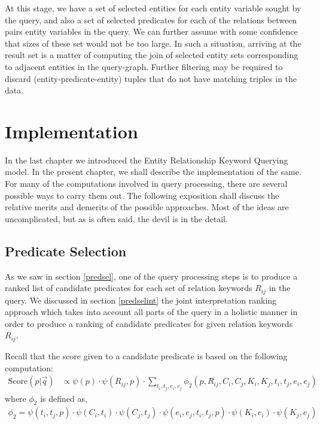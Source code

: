 \documentclass[a4paper, twoside, 12pt]{report}
\begin{document}
At this stage, we have a set of selected entities for each entity variable sought by the query, and also a set of selected predicates for each of the relations between pairs entity variables in the query. We can further assume with some confidence that sizes of these set would not be too large. In such a situation, arriving at the result set is a matter of computing the join of selected entity sets corresponding  to adjacent entities in the query-graph. Further filtering may be required to discard (entity-predicate-entity) tuples that do not have matching triples in the data.




\chapter{Implementation}

In the last chapter we introduced the Entity Relationship Keyword Querying model. In the present chapter, we shall describe the implementation of the same. For many of the computations involved in query processing, there are several possible ways to carry them out. The following exposition shall discuss the relative merits and demerits of the possible approaches. Most of the ideas are uncomplicated, but as is often said, the devil is in the detail.

\section{Predicate Selection}
As we saw in section \ref{predsel}, one of the query processing steps is to produce a ranked list of candidate predicates for each set of relation keywords $R_{ij}$ in the query. We discussed in section \ref{predselint} the joint interpretation ranking approach which takes into account all parts of the query in a holistic manner in order to produce a ranking of candidate predicates for given relation keywords $R_{ij}$. 

Recall that the score given to a candidate predicate is based on the following computation:
\begin{align}
\text{Score}(p|\vec{q})& \propto \psi(p) \cdot \psi(R_{ij},p) \cdot \sum_{t_i,t_j,e_i,e_j} \phi_2(p, R_{ij}, C_i, C_j, K_i, K_j, t_i, t_j, e_i, e_j) \label{eq:predsel1}
\end{align}
where $\phi_2$ is defined as,
\begin{align}
\phi_2 =  \psi(t_i,t_j,p) \cdot \psi(C_i,t_i) \cdot \psi(C_j,t_j) \cdot \psi(e_i,e_j,t_i,t_j,p) \cdot \psi(K_i,e_i) \cdot \psi(K_j,e_j) \label{eq:phi2}
\end{align}
\end{document}
